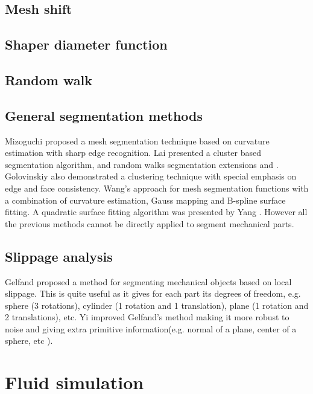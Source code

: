\subsection{Mesh shift}

\subsection{Shaper diameter function}

\subsection{Random walk}

\subsection{General segmentation methods}

Mizoguchi \cite{Mizoguchi2006} proposed a mesh segmentation technique based on curvature estimation with sharp edge recognition.
Lai \cite{Lai2006} presented a cluster based segmentation algorithm,
and random walks segmentation extensions \cite{Lai2008} and  \cite{Lai2009}.
Golovinskiy \cite{Golovinskiy2009} also demonstrated a clustering technique with special emphasis on edge and face consistency.
Wang's \cite{Wang2011} approach for mesh segmentation functions with a combination of curvature estimation, Gauss mapping and B-spline surface fitting.
A quadratic surface fitting algorithm was presented by Yang \cite{Yan2012}.
However all the previous methods cannot be directly applied to segment mechanical parts.

\subsection{Slippage analysis}

Gelfand \cite{Gelfand2004}  proposed a method for segmenting mechanical objects based on local slippage.
This is quite useful as it gives for each part its degrees of freedom, e.g. sphere (3 rotations), cylinder (1 rotation and 1 translation), plane (1 rotation and 2 translations), etc.
Yi \cite{Yi2014} improved Gelfand's method making it more robust to noise and giving extra primitive information(e.g. normal of a plane, center of a sphere, etc ).



\section{Fluid simulation}
\label{prevWorkFluidSim}

